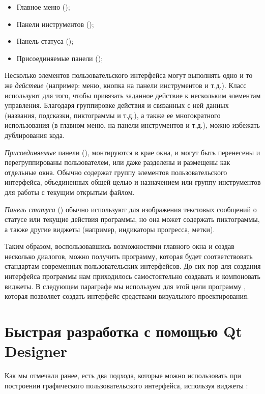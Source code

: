 \begin{itemize}
\item Главное меню ();
\item Панели инструментов ();
\item Панель статуса ();
\item Присоединяемые панели ();
\end{itemize}
Несколько элементов пользовательского интерфейса могут выполнять одно и то же \emph{действие} (например: меню,
кнопка на панели инструментов и т.д.). Класс  используют для того, чтобы
привязать заданное действие к нескольким элементам управления. Благодаря группировке действия и связанных с ней данных
(названия, подсказки, пиктограммы и т.д.), а также ее многократного использования (в главном меню, на панели
инструментов и т.д.), можно избежать дублирования кода.

\emph{Присоединяемые} панели 
(), монтируются в крае окна, и могут быть перенесены и перегруппированы
пользователем, или даже разделены и размещены как отдельные окна. Обычно содержат группу элементов пользовательского
интерфейса, объединенных общей целью и назначением или группу инструментов для работы с текущим открытым файлом.

\emph{Панель статуса} 
() обычно используют для изображения текстовых сообщений о статусе или текущие
действия программы, но она может содержать пиктограммы, а также другие виджеты (например, индикаторы прогресса, метки).

Таким образом, воспользовавшись возможностями главного окна и создав несколько диалогов, можно получить программу,
которая будет соответствовать стандартам современных пользовательских интерфейсов. До сих пор для создания интерфейса
программы нам приходилось самостоятельно создавать и компоновать виджеты. В следующем параграфе мы используем для этой
цели программу , которая позволяет создать интерфейс средствами визуального проектирования.

\section[Быстрая разработка с помощью Qt Designer]{Быстрая разработка с помощью Qt Designer}
Как мы отмечали ранее, есть два подхода, которые можно использовать при построении графического пользовательского
интерфейса, используя виджеты :


